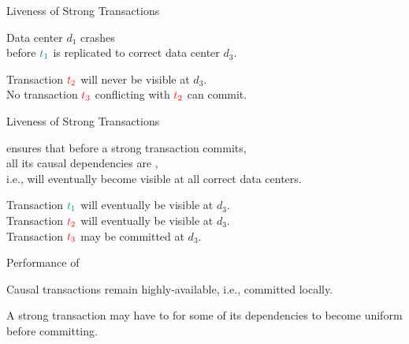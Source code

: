\begin{frame}{Liveness of Strong Transactions}
  \begin{center}
    Data center $d_{1}$ crashes \\[3pt]
    before $\textcolor{teal}{t_{1}}$ is replicated to correct data center $d_{3}$.

    \vspace{0.50cm}

    \pause
    \vspace{0.30cm}
    Transaction $\textcolor{red}{t_{2}}$ will never be visible at $d_{3}$. \\[3pt]
    No transaction $\textcolor{red}{t_{3}}$ conflicting with $\textcolor{red}{t_{2}}$ can commit.
  \end{center}
\end{frame}

\begin{frame}{Liveness of Strong Transactions}
  \begin{center}
    \unistore{} ensures that before a strong transaction commits, \\[3pt]
    all its causal dependencies are , \\[3pt]
    i.e., will eventually become visible at all correct data centers.

    \vspace{0.30cm}

    \pause
    Transaction $\textcolor{teal}{t_{1}}$ will eventually be visible at $d_{3}$. \\[3pt]
    Transaction $\textcolor{red}{t_{2}}$ will eventually be visible at $d_{3}$. \\[3pt]
    Transaction $\textcolor{red}{t_{3}}$ may be committed at $d_{3}$. \\[3pt]
  \end{center}
\end{frame}

\begin{frame}{Performance of \unistore}
  \begin{center}
    Causal transactions remain highly-available, i.e., committed locally. \\[6pt]

    \vspace{0.30cm}

    \vspace{0.20cm}
    A strong transaction may have to  for some of its dependencies
    to become uniform before committing.

    \pause
    \vspace{0.50cm}
  \end{center}
\end{frame}

